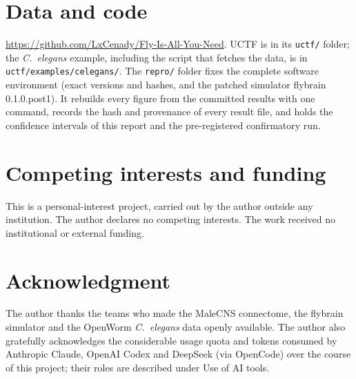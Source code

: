 \documentclass[conference]{IEEEtran}
\begin{document}
\section*{Data and code}
\url{https://github.com/LxCenady/Fly-Is-All-You-Need}. UCTF is in its
\texttt{uctf/} folder; the \textit{C.~elegans} example, including the script
that fetches the data, is in \texttt{uctf/examples/celegans/}. The
\texttt{repro/} folder fixes the complete software environment (exact versions
and hashes, and the patched simulator flybrain 0.1.0.post1). It rebuilds every
figure from the committed results with one command, records the hash and
provenance of every result file, and holds the confidence intervals of this
report and the pre-registered confirmatory run.

\section*{Competing interests and funding}
This is a personal-interest project, carried out by the author outside any
institution. The author declares no competing interests. The work received no
institutional or external funding.

\section*{Acknowledgment}
The author thanks the teams who made the MaleCNS connectome, the flybrain
simulator and the OpenWorm \textit{C.~elegans} data openly available. The
author also gratefully acknowledges the considerable usage quota and tokens
consumed by Anthropic Claude, OpenAI Codex and DeepSeek (via OpenCode) over the
course of this project; their roles are described under Use of AI tools.
\end{document}
